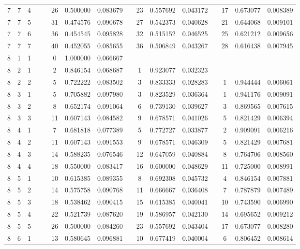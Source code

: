 \begin{appendix}
\begin{longtable}[h]{rrrccccccccccccc}
7	&	7	&	4	&&&	26	&	0.500000	&	0.083679	&&	23	&	0.557692	&	0.043172	&&	17	&	0.673077	&	0.008389	\\
7	&	7	&	5	&&&	31	&	0.474576	&	0.090678	&&	27	&	0.542373	&	0.040628	&&	21	&	0.644068	&	0.009101	\\
7	&	7	&	6	&&&	36	&	0.454545	&	0.095828	&&	32	&	0.515152	&	0.046525	&&	25	&	0.621212	&	0.009656	\\
7	&	7	&	7	&&&	40	&	0.452055	&	0.085655	&&	36	&	0.506849	&	0.043267	&&	28	&	0.616438	&	0.007945	\\
8	&	1	&	1	&&&	0	&	1.000000	&	0.066667	&&		&		&		&&		&		&		\\
8	&	2	&	1	&&&	2	&	0.846154	&	0.068687	&&	1	&	0.923077	&	0.032323	&&		&		&		\\
8	&	2	&	2	&&&	5	&	0.722222	&	0.083502	&&	3	&	0.833333	&	0.028283	&&	1	&	0.944444	&	0.006061	\\
8	&	3	&	1	&&&	5	&	0.705882	&	0.097980	&&	3	&	0.823529	&	0.036364	&&	1	&	0.941176	&	0.009091	\\
8	&	3	&	2	&&&	8	&	0.652174	&	0.091064	&&	6	&	0.739130	&	0.039627	&&	3	&	0.869565	&	0.007615	\\
8	&	3	&	3	&&&	11	&	0.607143	&	0.084582	&&	9	&	0.678571	&	0.041026	&&	5	&	0.821429	&	0.006394	\\
8	&	4	&	1	&&&	7	&	0.681818	&	0.077389	&&	5	&	0.772727	&	0.033877	&&	2	&	0.909091	&	0.006216	\\
8	&	4	&	2	&&&	11	&	0.607143	&	0.091553	&&	9	&	0.678571	&	0.046309	&&	5	&	0.821429	&	0.007681	\\
8	&	4	&	3	&&&	14	&	0.588235	&	0.076546	&&	12	&	0.647059	&	0.040884	&&	8	&	0.764706	&	0.008560	\\
8	&	4	&	4	&&&	18	&	0.550000	&	0.083417	&&	16	&	0.600000	&	0.048629	&&	11	&	0.725000	&	0.008991	\\
8	&	5	&	1	&&&	10	&	0.615385	&	0.089355	&&	8	&	0.692308	&	0.045732	&&	4	&	0.846154	&	0.007881	\\
8	&	5	&	2	&&&	14	&	0.575758	&	0.090768	&&	11	&	0.666667	&	0.036408	&&	7	&	0.787879	&	0.007489	\\
8	&	5	&	3	&&&	18	&	0.538462	&	0.090415	&&	15	&	0.615385	&	0.040041	&&	10	&	0.743590	&	0.006990	\\
8	&	5	&	4	&&&	22	&	0.521739	&	0.087620	&&	19	&	0.586957	&	0.042130	&&	14	&	0.695652	&	0.009212	\\
8	&	5	&	5	&&&	26	&	0.500000	&	0.084260	&&	23	&	0.557692	&	0.043404	&&	17	&	0.673077	&	0.008280	\\
8	&	6	&	1	&&&	13	&	0.580645	&	0.096881	&&	10	&	0.677419	&	0.040004	&&	6	&	0.806452	&	0.008614	\\

\end{longtable}
\end{appendix}
